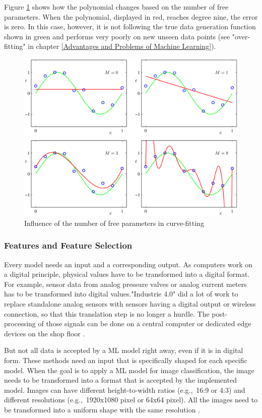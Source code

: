 Figure \ref{fig:poly} shows how the polynomial changes based on the number of free parameters. When the polynomial, displayed in red, reaches degree nine, the error is zero. In this case, however, it is not following the true data generation function shown in green and performs very poorly on new unseen data points (see "over-fitting" in chapter \ref{Advantages and Problems of Machine Learning}).
\begin{figure}[H]
	\centering
	\includegraphics[width=0.8\linewidth]{IMGs/poly.png}
	\caption{Influence of the number of free parameters in curve-fitting \cite{Bishop}}
	\label{fig:poly}
\end{figure}

\subsubsection*{Features and Feature Selection}
Every model needs an input and a corresponding output. As computers work on a digital principle, physical values have to be transformed into a digital format. For example, sensor data from analog pressure valves or analog current meters has to be transformed into digital values.\newline "Industrie 4.0" did a lot of work to replace standalone analog sensors with sensors having a digital output or wireless connection, so that this translation step is no longer a hurdle. The post-processing of those signals can be done on a central computer or dedicated edge devices on the shop floor \cite{Lu}.

But not all data is accepted by a ML model right away, even if it is in digital form. These methods need an input that is specifically shaped for each specific model.
When the goal is to apply a ML model for image classification, the image needs to be transformed into a format that is accepted by the implemented model. Images can have different height-to-width ratios (e.g.,~16:9 or 4:3) and different resolutions (e.g.,~1920x1080 pixel or 64x64 pixel). All the images need to be transformed into a uniform shape with the same resolution \cite{Park}.

